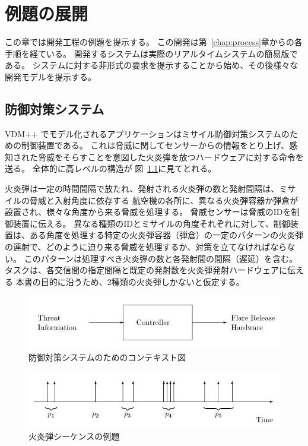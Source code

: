 \documentclass[\pformat,12pt]{jreport}
\begin{document}
\chapter{例題の展開}\label{chap:example}

この章では開発工程の例題を提示する。
この開発は第~\ref{chap:process}章からの各手順を経ている。
開発するシステムは実際のリアルタイムシステムの簡易版である。
システムに対する非形式の要求を提示することから始め、その後様々な開発モデルを提示する。

\section{防御対策システム}\label{sec:CMdesc}

 VDM++ でモデル化されるアプリケーションはミサイル防御対策システムのための制御装置である。
これは脅威に関してセンサーからの情報をとり上げ、感知された脅威をそらすことを意図した火炎弾を放つハードウェアに対する命令を送る。
全体的に高レベルの構造が 図~\ref{fig:contextdiag}に見てとれる。

火炎弾は一定の時間間隔で放たれ、発射される火炎弾の数と発射間隔は、ミサイルの脅威と入射角度に依存する
航空機の各所に、異なる火炎弾容器か弾倉が設置され、様々な角度から来る脅威を処理する。
脅威センサーは脅威のIDを制御装置に伝える。
異なる種類のIDとミサイルの角度それぞれに対して、制御装置は、ある角度を処理する特定の火炎弾容器（弾倉）の一定のパターンの火炎弾の連射で、どのように迫り来る脅威を処理するか、対策を立てなければならない。
このパターンは処理すべき火炎弾の数と各発射間の間隔（遅延）を含む。
タスクは、各交信間の指定間隔と既定の発射数を火炎弾発射ハードウェアに伝える
本書の目的に沿うため、2種類の火炎弾しかないと仮定する。

\begin{figure}
\begin{center}
\includegraphics[width=\textwidth]{contextdia}
\end{center}
\caption{防御対策システムのためのコンテキスト図}\label{fig:contextdiag}
\end{figure}

\begin{figure}
\begin{center}
\includegraphics[width=\textwidth]{flareseqs}
\end{center}
\caption{火炎弾シーケンスの例題}\label{fig:firing}
\end{figure}
\end{document}
